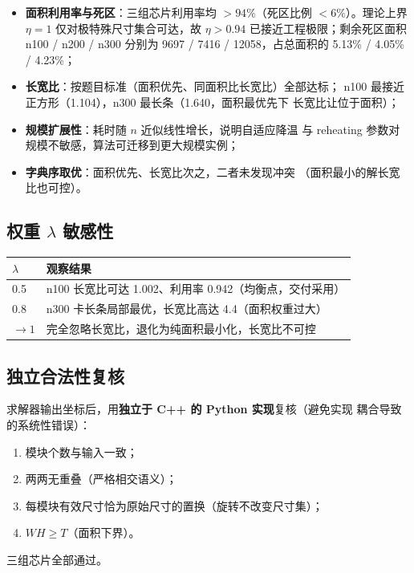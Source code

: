 \documentclass[12pt,a4paper]{article}
\begin{document}
\begin{itemize}
    \item \textbf{面积利用率与死区}：三组芯片利用率均 $> 94\%$（死区比例
    $< 6\%$）。理论上界 $\eta = 1$ 仅对极特殊尺寸集合可达，故 $\eta > 0.94$
    已接近工程极限；剩余死区面积 n100 / n200 / n300 分别为 9697 / 7416 /
    12058，占总面积的 5.13\% / 4.05\% / 4.23\%；
    \item \textbf{长宽比}：按题目标准（面积优先、同面积比长宽比）全部达标；
    n100 最接近正方形（1.104），n300 最长条（1.640，面积最优先下
    长宽比让位于面积）；
    \item \textbf{规模扩展性}：耗时随 $n$ 近似线性增长，说明自适应降温
    与 reheating 参数对规模不敏感，算法可迁移到更大规模实例；
    \item \textbf{字典序取优}：面积优先、长宽比次之，二者未发现冲突
    （面积最小的解长宽比也可控）。
\end{itemize}

\subsection{权重 $\lambda$ 敏感性}
\label{sec:lambda}

\begin{table}[H]
\centering
\small
\begin{tabular}{ll}
\toprule
$\lambda$ & 观察结果 \\
\midrule
0.5 & n100 长宽比可达 1.002、利用率 0.942（均衡点，交付采用） \\
0.8 & n300 卡长条局部最优，长宽比高达 4.4（面积权重过大） \\
$\to 1$ & 完全忽略长宽比，退化为纯面积最小化，长宽比不可控 \\
\bottomrule
\end{tabular}
\end{table}

\subsection{独立合法性复核}

求解器输出坐标后，用\textbf{独立于 C++ 的 Python 实现}复核（避免实现
耦合导致的系统性错误）：
\begin{enumerate}
    \item 模块个数与输入一致；
    \item 两两无重叠（严格相交语义）；
    \item 每模块有效尺寸恰为原始尺寸的置换（旋转不改变尺寸集）；
    \item $WH \ge T$（面积下界）。
\end{enumerate}
三组芯片全部通过。
\end{document}
